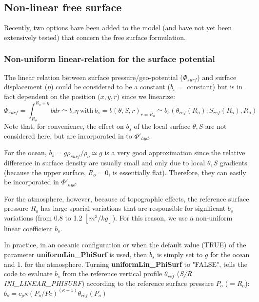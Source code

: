 


\subsection{Non-linear free surface}

Recently, two options have been added to the model (and have not yet
been extensively tested) that concern the free surface formulation.


\subsubsection{Non-uniform linear-relation for the surface potential}

The linear relation between surface pressure/geo-potential
($\Phi_{surf}$) and surface displacement ($\eta$) could be considered
to be a constant ($b_s=$ constant)
but is in fact dependent on the position ($x,y,r$)
since we linearize:
$$\Phi_{surf}=\int_{R_o}^{R_o+\eta} b dr \simeq b_s \eta
~\mathrm{with}~ b_s = b(\theta,S,r)_{r=R_o} 
\simeq b_s(\theta_{ref}(R_o),S_{ref}(R_o),R_o)$$
Note that, for convenience, the effect on $b_s$ of the local surface
$\theta,S$ are not considered here, but are incorporated in to
$\Phi'_{hyd}$.

For the ocean, $b_s = g \rho_{surf} / \rho_o \simeq g$ is a very good
approximation since the relative difference in surface density are
usually small and only due to local $\theta,S$ gradients (because the
upper surface, $R_o = 0$, is essentially flat). Therefore, they can
easily be incorporated in $\Phi'_{hyd}$.

For the atmosphere, however, because of topographic effects, the
reference surface pressure $R_o$ has large spacial variations that
are responsible for significant $b_s$ variations (from 0.8 to 1.2
$[m^3/kg]$). For this reason, we use a non-uniform linear coefficient
$b_s$.

In practice, in an oceanic configuration or when the default value
(TRUE) of the parameter {\bf uniformLin\_PhiSurf} is used, then $b_s$
is simply set to $g$ for the ocean and $1.$ for the atmosphere.
Turning {\bf uniformLin\_PhiSurf} to "FALSE", tells the code to
evaluate $b_s$ from the reference vertical profile $\theta_{ref}$
({\it S/R INI\_LINEAR\_PHISURF}) according to the reference surface
pressure $P_o$ ($=R_o$): $b_s = c_p \kappa (P_o / Pc)^{(\kappa - 1)}
\theta_{ref}(P_o)$


